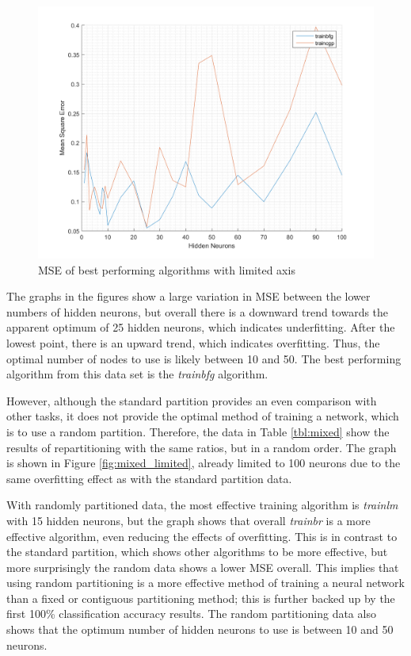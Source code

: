 \documentclass[a4paper, 10pt, conference]{ieeeconf}
\begin{document}
\begin{figure}[!ht]
    \centering
    \includegraphics[width=\linewidth]{pic/unmixed_best_limited.png}
    \caption{MSE of best performing algorithms with limited axis}
    \label{fig:unmixed_limited}
\end{figure}

The graphs in the figures show a large variation in MSE between the lower numbers of hidden neurons, but overall there is a downward trend towards the apparent optimum of 25 hidden neurons, which indicates underfitting. After the lowest point, there is an upward trend, which indicates overfitting. Thus, the optimal number of nodes to use is likely between 10 and 50. The best performing algorithm from this data set is the \textit{trainbfg} algorithm.

However, although the standard partition provides an even comparison with other tasks, it does not provide the optimal method of training a network, which is to use a random partition. Therefore, the data in Table \ref{tbl:mixed} show the results of repartitioning with the same ratios, but in a random order. The graph is shown in Figure \ref{fig:mixed_limited}, already limited to 100 neurons due to the same overfitting effect as with the standard partition data.

With randomly partitioned data, the most effective training algorithm is \textit{trainlm} with 15 hidden neurons, but the graph shows that overall \textit{trainbr} is a more effective algorithm, even reducing the effects of overfitting. This is in contrast to the standard partition, which shows other algorithms to be more effective, but more surprisingly the random data shows a lower MSE overall. This implies that using random partitioning is a more effective method of training a neural network than a fixed or contiguous partitioning method; this is further backed up by the first 100\% classification accuracy results. The random partitioning data also shows that the optimum number of hidden neurons to use is between 10 and 50 neurons.
\end{document}
